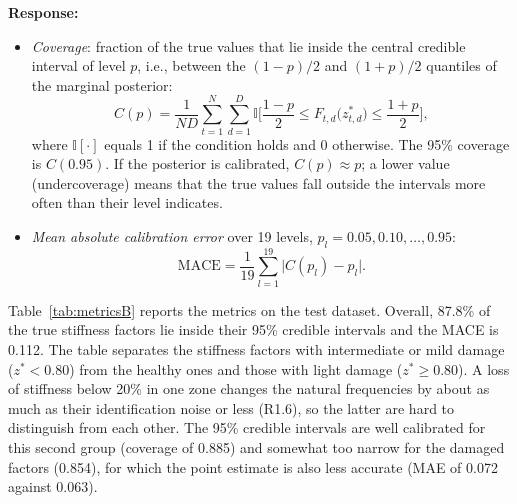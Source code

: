 \documentclass[11pt]{article}
\newenvironment{response}{\par\smallskip\noindent\color{resp}\textbf{Response:}\ }{\par}
\begin{document}
\begin{response}
\begin{itemize}[leftmargin=*]
\begin{equation}
			\mathrm{ALL}=\frac{1}{ND}\sum_{t=1}^{N}\sum_{d=1}^{D}\log q_{t,d}\big(z^*_{t,d}\big).
			\label{eq:all}
		\end{equation}
		\item \emph{Coverage}: fraction of the true values that lie inside the central credible interval of level $p$, i.e.,
		between the $(1-p)/2$ and $(1+p)/2$ quantiles of the marginal posterior:
		\begin{equation}
			C(p)=\frac{1}{ND}\sum_{t=1}^{N}\sum_{d=1}^{D}\mathbb{I}\Big[\frac{1-p}{2}\le F_{t,d}\big(z^*_{t,d}\big)\le\frac{1+p}{2}\Big],
			\label{eq:coverage}
		\end{equation}
		where $\mathbb{I}[\cdot]$ equals 1 if the condition holds and 0 otherwise. The 95\% coverage is $C(0.95)$. If the
		posterior is calibrated, $C(p)\approx p$; a lower value (undercoverage) means that the true values fall outside the
		intervals more often than their level indicates.
		\item \emph{Mean absolute calibration error} over 19 levels, $p_l=0.05,0.10,\dots,0.95$:
		\begin{equation}
			\mathrm{MACE}=\frac{1}{19}\sum_{l=1}^{19}\big|C(p_l)-p_l\big|.
			\label{eq:mace}
		\end{equation}
	\end{itemize}


	Table~\ref{tab:metricsB} reports the metrics on the test dataset. Overall, 87.8\% of the true stiffness factors lie inside
	their 95\% credible intervals and the MACE is 0.112. The table separates the stiffness factors with intermediate or mild
	damage ($z^*<0.80$) from the healthy ones and those with light damage ($z^*\ge0.80$). A loss of stiffness below 20\% in
	one zone changes the natural frequencies by about as much as their identification noise or less (R1.6), so the latter
	are hard to distinguish from each other. The 95\% credible intervals are well calibrated for this second group (coverage
	of 0.885) and somewhat too narrow for the damaged factors (0.854), for which the point estimate is also less accurate
	(MAE of 0.072 against 0.063).
	

\end{response}
\end{document}

